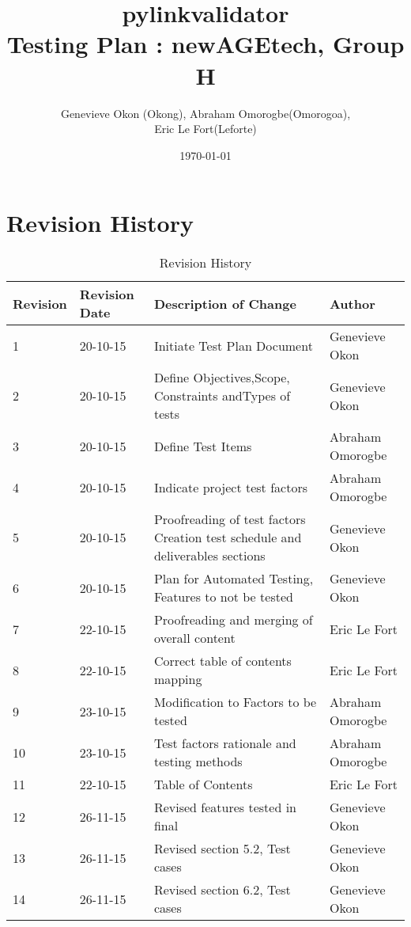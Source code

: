 \documentclass[12pt, titlepage]{article}
\begin{document}
\title{pylinkvalidator \\
 Testing Plan : newAGEtech, Group H }
\author{Genevieve Okon (Okong), Abraham Omorogbe(Omorogoa),\\
 Eric Le Fort(Leforte)}
\date{\today}
\maketitle
\pagebreak


\tableofcontents

\pagebreak
\listoffigures
\listoftables
\pagebreak


\section{Revision History}
\begin{table}[h!]
	\begin{tabular}{| p{5cm} | p{5cm} | p{5cm} |p{5cm} |}    \hline
Revision  &Revision Date &Description of Change &Author\\ \hline
1& 20-10-15& Initiate Test Plan Document&Genevieve Okon\\ \hline
2& 20-10-15& Define Objectives,Scope, Constraints andTypes of tests&Genevieve Okon\\ \hline
3& 20-10-15& Define Test Items&Abraham Omorogbe\\ \hline
4& 20-10-15& Indicate project test factors&Abraham Omorogbe\\ \hline
5& 20-10-15&Proofreading of test factors Creation test schedule and deliverables sections&Genevieve Okon\\ \hline
6& 20-10-15&Plan for Automated Testing, Features to not be tested&Genevieve Okon\\ \hline
7& 22-10-15& Proofreading and merging of overall content&Eric Le Fort\\ \hline
8& 22-10-15& Correct table of contents mapping&Eric Le Fort\\ \hline
9& 23-10-15& Modification to Factors to be tested&Abraham Omorogbe\\ \hline
10& 23-10-15& Test factors rationale and testing methods&Abraham Omorogbe\\ \hline
11& 22-10-15& Table of Contents&Eric Le Fort\\ \hline

12& 26-11-15& Revised features tested in final&Genevieve Okon\\ \hline
13& 26-11-15& Revised section 5.2, Test cases&Genevieve Okon\\ \hline
14& 26-11-15& Revised section 6.2, Test cases&Genevieve Okon\\ \hline
       \end{tabular}
       
       \caption{Revision History}
       \label{table:Revision History}
\end{table}
\end{document}
